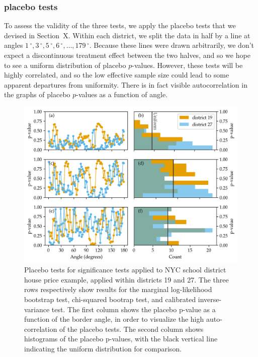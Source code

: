 \documentclass[letter]{article}
\makeatletter
\def\maxwidth{\ifdim\Gin@nat@width>\linewidth\linewidth
\else\Gin@nat@width\fi}
\let\Oldincludegraphics\includegraphics
\renewcommand{\includegraphics}[1]{\Oldincludegraphics[width=1.0\maxwidth]{#1}}
\newcommand{\degree}{{\,^\circ}}
\makeatother
\begin{document}
    	\subsubsection{placebo tests}\label{placebo-tests}

To assess the validity of the three tests, we apply the placebo tests that we devised in Section~X.
Within each district, we split the data in half by a line at angles \(1\degree,3\degree,5\degree,6\degree,\ldots,179\degree\).
Because these lines were drawn arbitrarily, we don't expect a discontinuous treatment effect between the two halves, and so we hope to see a uniform distribution of placebo \(p\)-values.
However, these tests will be highly correlated,
and so the low effective sample size could lead to some apparent departures from uniformity.
There is in fact visible autocorrelation in the graphs of placebo \(p\)-values as a function of angle.
    


    	\begin{figure}
\centering
\includegraphics{../NYC/NYC_plots/NYC_placebos.png}
\caption{\label{fig:nyc_placebos} Placebo tests for significance tests applied to NYC school district house price example, applied within districts 19 and 27. The three rows respectively show results for the marginal log-likelihood bootstrap test, chi-squared bootrap test, and calibrated inverse-variance test. The first column shows the placebo p-value as a function of the border angle, in order to visualize the high auto-correlation of the placebo tests. The second column shows histograms of the placebo p-values, with the black vertical line indicating the uniform distribution for comparison.}
\end{figure}
    
\end{document}
